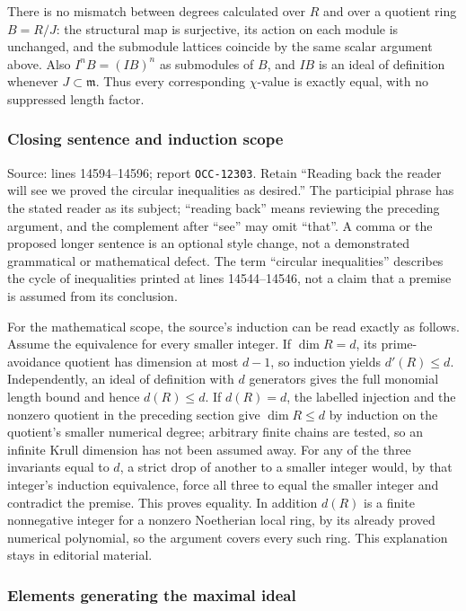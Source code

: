 There is no mismatch between degrees calculated over \(R\) and over a quotient ring \(B=R/J\): the structural map is surjective, its action on each module is unchanged, and the submodule lattices coincide by the same scalar argument above. Also \(I^nB=(IB)^n\) as submodules of \(B\), and \(IB\) is an ideal of definition whenever \(J\subset\mathfrak m\). Thus every corresponding \(\chi\)-value is exactly equal, with no suppressed length factor.

\subsubsection{Closing sentence and induction scope}\label{algebra-proof-003-closing-sentence-and-induction-scope}

Source: lines 14594--14596; report \texttt{OCC-12303}. Retain ``Reading back the reader will see we proved the circular inequalities as desired.'' The participial phrase has the stated reader as its subject; ``reading back'' means reviewing the preceding argument, and the complement after ``see'' may omit ``that''. A comma or the proposed longer sentence is an optional style change, not a demonstrated grammatical or mathematical defect. The term ``circular inequalities'' describes the cycle of inequalities printed at lines 14544--14546, not a claim that a premise is assumed from its conclusion.

For the mathematical scope, the source's induction can be read exactly as follows. Assume the equivalence for every smaller integer. If \(\dim R=d\), its prime-avoidance quotient has dimension at most \(d-1\), so induction yields \(d'(R)\leq d\). Independently, an ideal of definition with \(d\) generators gives the full monomial length bound and hence \(d(R)\leq d\). If \(d(R)=d\), the labelled injection and the nonzero quotient in the preceding section give \(\dim R\leq d\) by induction on the quotient's smaller numerical degree; arbitrary finite chains are tested, so an infinite Krull dimension has not been assumed away. For any of the three invariants equal to \(d\), a strict drop of another to a smaller integer would, by that integer's induction equivalence, force all three to equal the smaller integer and contradict the premise. This proves equality. In addition \(d(R)\) is a finite nonnegative integer for a nonzero Noetherian local ring, by its already proved numerical polynomial, so the argument covers every such ring. This explanation stays in editorial material.

\subsubsection{Elements generating the maximal ideal}\label{algebra-proof-003-elements-generating-the-maximal-ideal}

